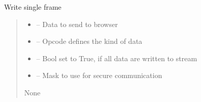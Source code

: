 \documentclass[letterpaper,10pt,english]{sphinxmanual}
\begin{document}
\begin{savenotes}
\begin{fulllineitems}
\begin{savenotes}
\begin{fulllineitems}
\end{fulllineitems}\end{savenotes}


\begin{savenotes}\begin{fulllineitems}
\label{\detokenize{eezz:eezz.websocket.TWebSocketClient.write_frame}}
\pysigstartsignatures
{}
\pysigstopsignatures
\sphinxAtStartPar
Write single frame
\begin{quote}\begin{description}
\begin{itemize}
\item {} 
\sphinxAtStartPar
{} – Data to send to browser

\item {} 
\sphinxAtStartPar
{} – Opcode defines the kind of data

\item {} 
\sphinxAtStartPar
{} – Bool set to True, if all data are written to stream

\item {} 
\sphinxAtStartPar
{} – Mask to use for secure communication

\end{itemize}

\sphinxAtStartPar
None

\end{description}\end{quote}

\end{fulllineitems}\end{savenotes}


\end{fulllineitems}\end{savenotes}
\end{document}
